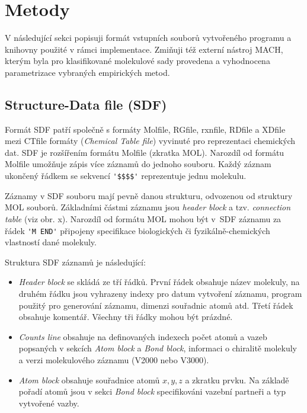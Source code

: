 \chapter{Metody}
V následující sekci popisuji formát vstupních souborů vytvořeného programu a kni\-hov\-ny použité v rámci implementace. Zmiňuji též externí nástroj MACH, kterým byla pro klasifikované molekulové sady provedena a vyhodnocena parametrizace vybraných empirických metod. 
\section{Structure-Data file (SDF)}
Formát SDF patří společně s formáty Molfile, RGfile, rxnfile, RDfile a XDfile mezi CTfile formáty (\textit{Chemical Table file}) vyvinuté pro reprezentaci chemických dat. SDF je rozšířením formátu Molfile (zkratka MOL). Narozdíl od formátu Molfile umožňuje zápis více záznamů do jednoho souboru. Každý záznam ukončený řádkem se sekvencí \verb|'$$$$'| reprezentuje jednu molekulu. 

Záznamy v SDF souboru mají pevně danou strukturu, odvozenou od struktury MOL souborů. Základními částmi záznamu jsou \textit{header block} a tzv. \textit{connection table} (viz obr. x). %
Narozdíl od formátu MOL mohou být v~SDF záznamu za řádek \verb|'M END'| připojeny specifikace biologických či fyzikálně-che\-mic\-kých vlastností dané molekuly. 

Struktura SDF záznamů je následující:
\begin{itemize}
    \item \textit{Header block} se skládá ze tří řádků. První řádek obsahuje název molekuly, na druhém řádku jsou vyhrazeny indexy pro datum vytvoření záznamu, program použitý pro generování záznamu, dimenzi souřadnic atomů atd. Třetí řádek obsahuje komentář. Všechny tři řádky mohou být prázdné.
    \item \textit{Counts line} obsahuje na definovaných indexech počet atomů a vazeb  popsaných v sekcích \textit{Atom block} a \textit{Bond block}, informaci o chiralitě molekuly a verzi molekulového záznamu (V2000 nebo V3000). 
    \item \textit{Atom block} obsahuje souřadnice atomů  $x, y, z$ a zkratku prvku. Na základě pořadí atomů jsou v sekci \textit{Bond block} specifikováni vazební partneři a typ vytvořené vazby.
\end{itemize}



